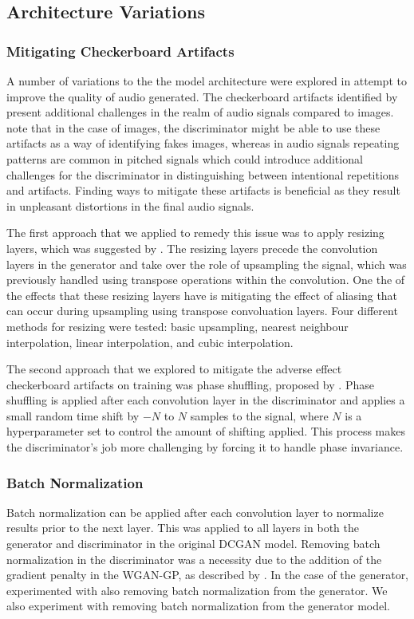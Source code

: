 \subsection{Architecture Variations}\label{sec:variation}
\subsubsection{Mitigating Checkerboard Artifacts}
A number of variations to the the model architecture were explored in attempt to improve the quality of audio generated. The checkerboard artifacts identified by \cite{Odena2016DeconvolutionAC} present additional challenges in the realm of audio signals compared to images. \cite{donahue2018adversarial} note that in the case of images, the discriminator might be able to use these artifacts as a way of identifying fakes images, whereas in audio signals repeating patterns are common in pitched signals which could introduce additional challenges for the discriminator in distinguishing between intentional repetitions and artifacts. Finding ways to mitigate these artifacts is beneficial as they result in unpleasant distortions in the final audio signals.

The first approach that we applied to remedy this issue was to apply resizing layers, which was suggested by \cite{Odena2016DeconvolutionAC}. The resizing layers precede the convolution layers in the generator and take over the role of upsampling the signal, which was previously handled using transpose operations within the convolution. One the of the effects that these resizing layers have is mitigating the effect of aliasing that can occur during upsampling using transpose convoluation layers. Four different methods for resizing were tested: basic upsampling, nearest neighbour interpolation, linear interpolation, and cubic interpolation.

The second approach that we explored to mitigate the adverse effect checkerboard artifacts on training was phase shuffling, proposed by \cite{donahue2018adversarial}. Phase shuffling is applied after each convolution layer in the discriminator and applies a small random time shift by $-N$ to $N$ samples to the signal, where $N$ is a hyperparameter set to control the amount of shifting applied. This process makes the discriminator's job more challenging by forcing it to handle phase invariance.

\subsubsection{Batch Normalization}
Batch normalization can be applied after each convolution layer to normalize results prior to the next layer. This was applied to all layers in both the generator and discriminator in the original DCGAN model. Removing batch normalization in the discriminator was a necessity due to the addition of the gradient penalty in the WGAN-GP, as described by \cite{gulrajani2017improved}. In the case of the generator, \cite{donahue2018adversarial} experimented with also removing batch normalization from the generator. We also experiment with removing batch normalization from the generator model.

